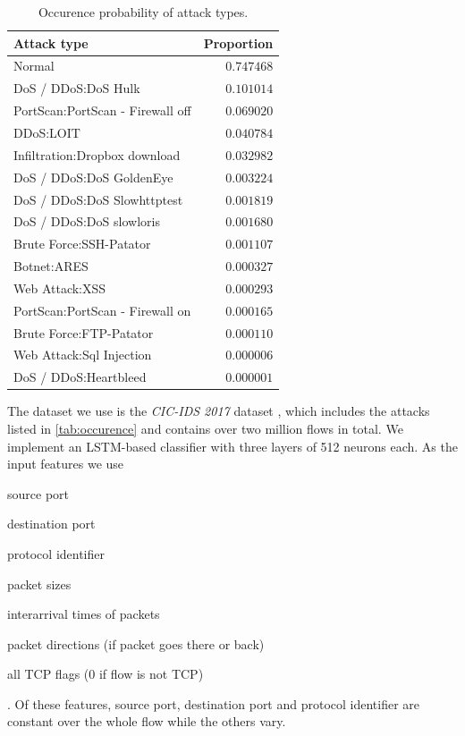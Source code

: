 \documentclass[conference]{IEEEtran}
\begin{document}
\begin{table}[b]
\caption{Occurence probability of attack types.} \label{tab:occurrence}
\centering
\begin{tabular}{l r} \toprule
Attack type & Proportion \\
\midrule
Normal                                                         & $0.747468$ \\
DoS / DDoS:DoS Hulk                                            & $0.101014$ \\
PortScan:PortScan - Firewall off                               & $0.069020$ \\
DDoS:LOIT                                                      & $0.040784$ \\
Infiltration:Dropbox download & $0.032982$ \\
DoS / DDoS:DoS GoldenEye                                       & $0.003224$ \\
DoS / DDoS:DoS Slowhttptest                                    & $0.001819$ \\
DoS / DDoS:DoS slowloris                                       & $0.001680$ \\
Brute Force:SSH-Patator                                        & $0.001107$ \\
Botnet:ARES                                                    & $0.000327$ \\
Web Attack:XSS                                                 & $0.000293$ \\
PortScan:PortScan - Firewall on                                & $0.000165$ \\
Brute Force:FTP-Patator                                        & $0.000110$ \\
Web Attack:Sql Injection                                       & $0.000006$ \\
DoS / DDoS:Heartbleed                                          & $0.000001$ \\
\bottomrule
\end{tabular}
\label{tab:occurence}
\end{table}

The dataset we use is the \textit{CIC-IDS 2017} dataset \cite{sharafaldin_toward_2018}, which includes the attacks listed in \autoref{tab:occurence} and contains over two million flows in total. We implement an LSTM-based classifier with three layers of 512 neurons each. As the input features we use \begin{itemize*}
\item source port
\item destination port
\item protocol identifier
\item packet sizes
\item interarrival times of packets
\item packet directions (if packet goes there or back)
\item all TCP flags (0 if flow is not TCP)
\end{itemize*}. Of these features, source port, destination port and protocol identifier are constant over the whole flow while the others vary.
\end{document}
